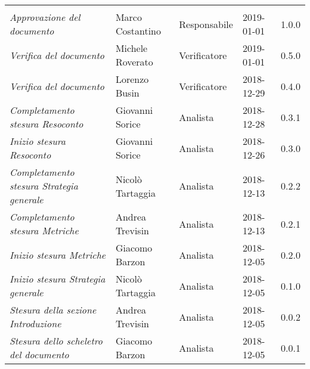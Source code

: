 \newpage 
\section*{}
\begin{table}[H]
	\centering
	\begin{tabular}{p{4cm}|C{3cm}|C{3cm}|R{2.5cm}|R{2cm}}
		
		 & & & & \\
		
		
		\emph{Approvazione del documento} & Marco Costantino & Responsabile & 2019-01-01 & 1.0.0 \\
		\hline
		
		\emph{Verifica del documento} & Michele Roverato & Verificatore & 2019-01-01 & 0.5.0 \\
		\hline
		
		\emph{Verifica del documento} & Lorenzo Busin & Verificatore & 2018-12-29 & 0.4.0 \\
		\hline
		
		\emph{Completamento stesura Resoconto} & Giovanni Sorice & Analista & 2018-12-28 & 0.3.1 \\
		\hline
		
		\emph{Inizio stesura Resoconto} & Giovanni Sorice & Analista & 2018-12-26 & 0.3.0 \\
		\hline
		
		\emph{Completamento stesura Strategia generale} & Nicolò Tartaggia & Analista & 2018-12-13 & 0.2.2 \\
		\hline
		
		\emph{Completamento stesura Metriche} & Andrea Trevisin & Analista & 2018-12-13 & 0.2.1 \\
		\hline
		
		\emph{Inizio stesura Metriche} & Giacomo Barzon & Analista & 2018-12-05 & 0.2.0 \\
		\hline
		
		\emph{Inizio stesura Strategia generale} & Nicolò Tartaggia & Analista & 2018-12-05 & 0.1.0 \\
		\hline
		
		\emph{Stesura della sezione Introduzione } & Andrea Trevisin & Analista & 2018-12-05 & 0.0.2 \\
		\hline
		
		\emph{Stesura dello scheletro del documento} & Giacomo Barzon & Analista & 2018-12-05 & 0.0.1 \\
		
	\end{tabular}
	
\end{table}


\clearpage
